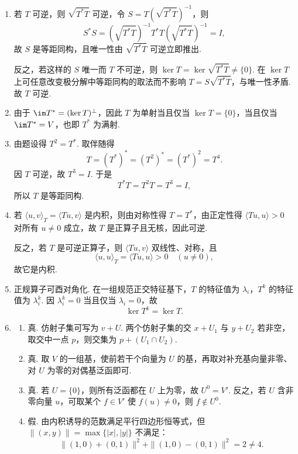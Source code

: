 \begin{enumerate}
    因此
    \[
        q=\frac{2}{\pi}\cdot 1+\left(\frac{2\sqrt{5}}{\pi}-\frac{24\sqrt{5}}{\pi^3}\right)\cdot 6\sqrt{5}\left(x^2-x+\frac{1}{6}\right)=\frac{2}{\pi}+\left(\frac{60}{\pi}-\frac{720}{\pi^3}\right)\left(x^2-x+\frac{1}{6}\right).
    \]

    \item 若 $T$ 可逆，则 $\sqrt{T^*T}$ 可逆，令 $S=T(\sqrt{T^*T})^{-1}$，则
    \[
        S^*S=(\sqrt{T^*T})^{-1}T^*T(\sqrt{T^*T})^{-1}=I,
    \]
    故 $S$ 是等距同构，且唯一性由 $\sqrt{T^*T}$ 可逆立即推出.

    反之，若这样的 $S$ 唯一而 $T$ 不可逆，则 $\ker T=\ker\sqrt{T^*T}\neq\{0\}$. 在 $\ker T$ 上可任意改变极分解中等距同构的取法而不影响 $T=S\sqrt{T^*T}$，与唯一性矛盾. 故 $T$ 可逆.

    \item 由于 $\im T^*=(\ker T)^\perp$，因此 $T$ 为单射当且仅当 $\ker T=\{0\}$，当且仅当 $\im T^*=V$，也即 $T^*$ 为满射.

    \item 由题设得 $T^2=T^*$. 取伴随得
    \[
        T=(T^*)^*=(T^2)^*=(T^*)^2=T^4.
    \]
    因 $T$ 可逆，故 $T^3=I$. 于是
    \[
        T^*T=T^2T=T^3=I,
    \]
    所以 $T$ 是等距同构.

    \item 若 $\langle u,v\rangle_T=\langle Tu,v\rangle$ 是内积，则由对称性得 $T=T^*$，由正定性得 $\langle Tu,u\rangle>0$ 对所有 $u\neq 0$ 成立，故 $T$ 是正算子且无核，因此可逆.

    反之，若 $T$ 是可逆正算子，则 $\langle Tu,v\rangle$ 双线性、对称，且
    \[
        \langle u,u\rangle_T=\langle Tu,u\rangle>0\quad(u\neq 0),
    \]
    故它是内积.

    \item 正规算子可酉对角化. 在一组规范正交特征基下，$T$ 的特征值为 $\lambda_i$，$T^k$ 的特征值为 $\lambda_i^k$. 因 $\lambda_i^k=0$ 当且仅当 $\lambda_i=0$，故
    \[
        \ker T^k=\ker T.
    \]

    \item
    \begin{enumerate}
        \item 真. 仿射子集可写为 $v+U$. 两个仿射子集的交 $x+U_1$ 与 $y+U_2$ 若非空，取交中一点 $p$，则交集为 $p+(U_1\cap U_2)$.

        \item 真. 取 $V$ 的一组基，使前若干个向量为 $U$ 的基，再取对补充基向量非零、对 $U$ 为零的对偶基泛函即可.

        \item 真. 若 $U=\{0\}$，则所有泛函都在 $U$ 上为零，故 $U^0=V'$. 反之，若 $U$ 含非零向量 $u$，可取某个 $f\in V'$ 使 $f(u)\neq 0$，则 $f\notin U^0$.

        \item 假. 由内积诱导的范数满足平行四边形恒等式，但 $\|(x,y)\|=\max\{|x|,|y|\}$ 不满足：
        \[
            \|(1,0)+(0,1)\|^2+\|(1,0)-(0,1)\|^2=2\neq 4.
        \]
    \end{enumerate}
\end{enumerate}

\clearpage
